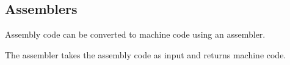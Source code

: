 
\subsection{Assemblers}

Assembly code can be converted to machine code using an assembler.

The assembler takes the assembly code as input and returns machine code.

